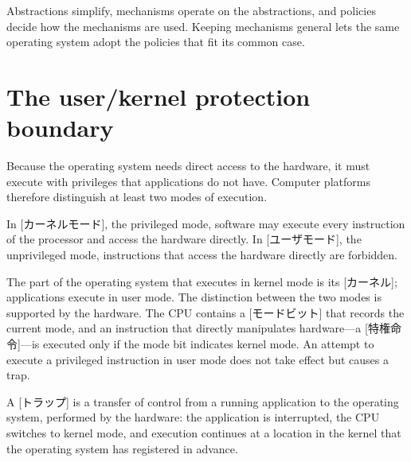 \documentclass[../main.tex]{subfiles}
\begin{document}
\begin{keypoint}
  Abstractions simplify, mechanisms operate on the abstractions, and
  policies decide how the mechanisms are used.  Keeping mechanisms general
  lets the same operating system adopt the policies that fit its common
  case.
\end{keypoint}

\section{The user/kernel protection boundary}
\label{sec:l01-boundary}

Because the operating system needs direct access to the hardware, it must
execute with privileges that applications do not
have.
Computer platforms therefore distinguish at least two modes of execution.

\begin{definition}
  In [カーネルモード], the privileged mode, software may
  execute every instruction of the processor and access the hardware
  directly.  In [ユーザモード], the unprivileged mode,
  instructions that access the hardware directly are forbidden.
\end{definition}

The part of the operating system that executes in kernel mode is its
[カーネル]; applications execute in user
mode.  The
distinction between the two modes is supported by the hardware.  The CPU
contains a [モードビット] that records the current mode, and
an instruction that directly manipulates hardware---a
[特権命令]---is executed only if the mode bit
indicates kernel mode.  An attempt to execute a privileged instruction in user mode
does not take effect but causes a trap.

\begin{definition}[Trap]
  A [トラップ] is a transfer of control from a running
  application to the operating system, performed by the hardware: the
  application is interrupted, the CPU switches to kernel mode, and
  execution continues at a location in the kernel that the operating
  system has registered in advance.
\end{definition}
\end{document}
